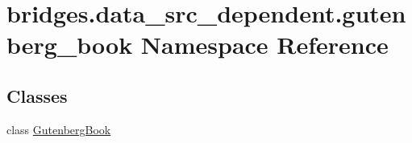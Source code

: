\hypertarget{namespacebridges_1_1data__src__dependent_1_1gutenberg__book}{}\section{bridges.\+data\+\_\+src\+\_\+dependent.\+gutenberg\+\_\+book Namespace Reference}
\label{namespacebridges_1_1data__src__dependent_1_1gutenberg__book}
\subsection*{Classes}
\begin{DoxyCompactItemize}
\item 
class \hyperlink{classbridges_1_1data__src__dependent_1_1gutenberg__book_1_1_gutenberg_book}{Gutenberg\+Book}
\end{DoxyCompactItemize}
